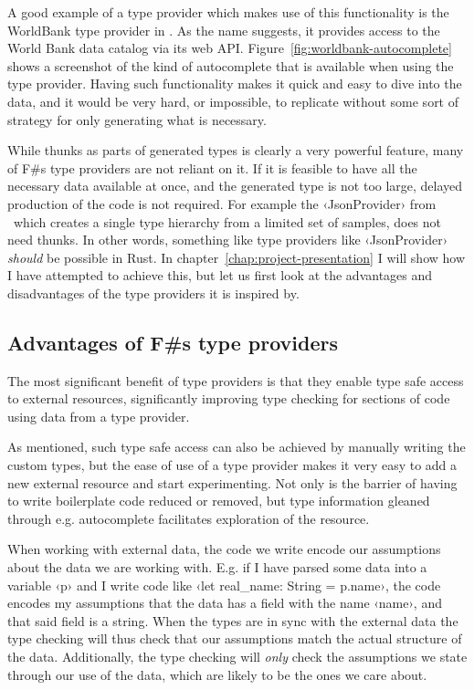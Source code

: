 A good example of a type provider which makes use of this functionality is the WorldBank type provider in \fsharpdata. As the name suggests, it provides access to the World Bank data catalog via its web API. Figure~\ref{fig:worldbank-autocomplete} shows a screenshot of the kind of autocomplete that is available when using the type provider. Having such functionality makes it quick and easy to dive into the data, and it would be very hard, or impossible, to replicate without some sort of strategy for only generating what is necessary.

While thunks as parts of generated types is clearly a very powerful feature, many of F\#s type providers are not reliant on it. If it is feasible to have all the necessary data available at once, and the generated type is not too large, delayed production of the code is not required. For example the ‹JsonProvider› from \fsharpdata\ which creates a single type hierarchy from a limited set of samples, does not need thunks. In other words, something like type providers like ‹JsonProvider› \emph{should} be possible in Rust. In chapter~\ref{chap:project-presentation} I will show how I have attempted to achieve this, but let us first look at the advantages and disadvantages of the type providers it is inspired by.

\subsection{Advantages of F\#s type providers}

The most significant benefit of type providers is that they enable type safe access to external resources, significantly improving type checking for sections of code using data from a type provider.

As mentioned, such type safe access can also be achieved by manually writing the custom types, but the ease of use of a type provider makes it very easy to add a new external resource and start experimenting. Not only is the barrier of having to write boilerplate code reduced or removed, but type information gleaned through e.g. autocomplete facilitates exploration of the resource.

When working with external data, the code we write encode our assumptions about the data we are working with. E.g. if I have parsed some data into a variable ‹p› and I write code like ‹let real_name: String = p.name›, the code encodes my assumptions that the data has a field with the name ‹name›, and that said field is a string. When the types are in sync with the external data the type checking will thus check that our assumptions match the actual structure of the data. Additionally, the type checking will \emph{only} check the assumptions we state through our use of the data, which are likely to be the ones we care about.

